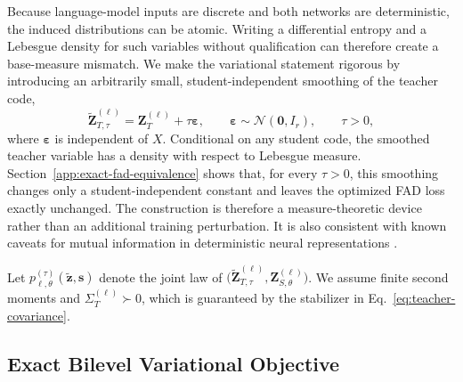 \documentclass{article}
\newcommand{\calN}{\mathcal{N}}
\newcommand{\bs}{\boldsymbol{s}}
\newcommand{\bz}{\boldsymbol{z}}
\newcommand{\bSigma}{\varSigma}
\newcommand{\bI}{I}
\theoremstyle{plain}
\theoremstyle{definition}
\theoremstyle{remark}
\begin{document}
Because language-model inputs are discrete and both networks are deterministic,
the induced distributions can be atomic.  Writing a differential entropy and a
Lebesgue density for such variables without qualification can therefore create a
base-measure mismatch.  We make the variational statement rigorous by introducing
an arbitrarily small, student-independent smoothing of the teacher code,
\begin{equation}
  \widetilde{\boldsymbol{Z}}_{T,\tau}^{(\ell)}
  =\boldsymbol{Z}_T^{(\ell)}+\tau\boldsymbol{\varepsilon},
  \qquad
  \boldsymbol{\varepsilon}\sim\calN(\boldsymbol{0},\bI_r),
  \qquad \tau>0,
  \label{eq:app-smoothed-teacher}
\end{equation}
where $\boldsymbol{\varepsilon}$ is independent of $X$.  Conditional on any
student code, the smoothed teacher variable has a density with respect to
Lebesgue measure.  Section~\ref{app:exact-fad-equivalence} shows that, for every
$\tau>0$, this smoothing changes only a student-independent constant and leaves
the optimized FAD loss exactly unchanged.  The construction is therefore a
measure-theoretic device rather than an additional training perturbation.  It is
also consistent with known caveats for mutual information in deterministic neural
representations \citep{amjad2018learning}.

Let $p_{\ell,\theta}^{(\tau)}(\widetilde{\bz},\bs)$ denote the joint law of
$\bigl(\widetilde{\boldsymbol{Z}}_{T,\tau}^{(\ell)},
\boldsymbol{Z}_{S,\theta}^{(\ell)}\bigr)$.  We assume finite second moments and
$\bSigma_T^{(\ell)}\succ0$, which is guaranteed by the stabilizer in
Eq.~\eqref{eq:teacher-covariance}.

\subsection{Exact Bilevel Variational Objective}
\label{app:bilevel-objective}
\end{document}
